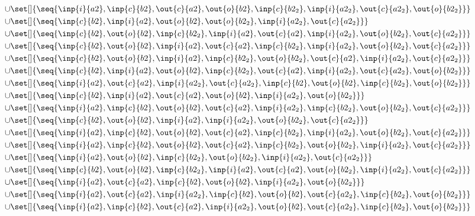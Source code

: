 \begin{align*}
\cup&\set[]{\seq{\inp{i}{a2},\inp{c}{b2},\out{c}{a2},\out{o}{b2},\inp{c}{b2_2},\inp{i}{a2_2},\out{c}{a2_2},\out{o}{b2_2}}}\\
\cup&\set[]{\seq{\inp{c}{b2},\inp{i}{a2},\out{o}{b2},\out{o}{b2_2},\inp{i}{a2_2},\out{c}{a2_2}}}\\
\cup&\set[]{\seq{\inp{c}{b2},\out{o}{b2},\inp{c}{b2_2},\inp{i}{a2},\out{c}{a2},\inp{i}{a2_2},\out{o}{b2_2},\out{c}{a2_2}}}\\
\cup&\set[]{\seq{\inp{c}{b2},\out{o}{b2},\inp{i}{a2},\out{c}{a2},\inp{c}{b2_2},\inp{i}{a2_2},\out{o}{b2_2},\out{c}{a2_2}}}\\
\cup&\set[]{\seq{\inp{c}{b2},\out{o}{b2},\inp{i}{a2},\inp{c}{b2_2},\out{o}{b2_2},\out{c}{a2},\inp{i}{a2_2},\out{c}{a2_2}}}\\
\cup&\set[]{\seq{\inp{c}{b2},\inp{i}{a2},\out{o}{b2},\inp{c}{b2_2},\out{c}{a2},\inp{i}{a2_2},\out{c}{a2_2},\out{o}{b2_2}}}\\
\cup&\set[]{\seq{\inp{i}{a2},\out{c}{a2},\inp{i}{a2_2},\out{c}{a2_2},\inp{c}{b2},\out{o}{b2},\inp{c}{b2_2},\out{o}{b2_2}}}\\
\cup&\set[]{\seq{\inp{c}{b2},\inp{i}{a2},\out{c}{a2},\out{o}{b2},\inp{i}{a2_2},\out{o}{b2_2}}}\\
\cup&\set[]{\seq{\inp{i}{a2},\inp{c}{b2},\out{o}{b2},\out{c}{a2},\inp{i}{a2_2},\inp{c}{b2_2},\out{o}{b2_2},\out{c}{a2_2}}}\\
\cup&\set[]{\seq{\inp{c}{b2},\out{o}{b2},\inp{i}{a2},\inp{i}{a2_2},\out{o}{b2_2},\out{c}{a2_2}}}\\
\cup&\set[]{\seq{\inp{i}{a2},\inp{c}{b2},\out{o}{b2},\out{c}{a2},\inp{c}{b2_2},\inp{i}{a2_2},\out{o}{b2_2},\out{c}{a2_2}}}\\
\cup&\set[]{\seq{\inp{i}{a2},\inp{c}{b2},\out{o}{b2},\out{c}{a2},\inp{c}{b2_2},\out{o}{b2_2},\inp{i}{a2_2},\out{c}{a2_2}}}\\
\cup&\set[]{\seq{\inp{i}{a2},\out{o}{b2},\inp{c}{b2_2},\out{o}{b2_2},\inp{i}{a2_2},\out{c}{a2_2}}}\\
\cup&\set[]{\seq{\inp{c}{b2},\out{o}{b2},\inp{c}{b2_2},\inp{i}{a2},\out{c}{a2},\out{o}{b2_2},\inp{i}{a2_2},\out{c}{a2_2}}}\\
\cup&\set[]{\seq{\inp{i}{a2},\out{c}{a2},\inp{c}{b2},\out{o}{b2},\inp{i}{a2_2},\out{o}{b2_2}}}\\
\cup&\set[]{\seq{\inp{i}{a2},\out{c}{a2},\inp{i}{a2_2},\inp{c}{b2},\out{o}{b2},\out{c}{a2_2},\inp{c}{b2_2},\out{o}{b2_2}}}\\
\cup&\set[]{\seq{\inp{i}{a2},\inp{c}{b2},\out{c}{a2},\inp{i}{a2_2},\out{o}{b2},\out{c}{a2_2},\inp{c}{b2_2},\out{o}{b2_2}}}\\

\end{align*}
